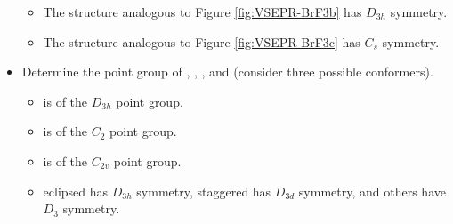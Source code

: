 \documentclass[../notes.tex]{subfiles}
\begin{document}
\begin{itemize}
\begin{itemize}
        \item The structure analogous to Figure \ref{fig:VSEPR-BrF3b} has $D_{3h}$ symmetry.
        \item The structure analogous to Figure \ref{fig:VSEPR-BrF3c} has $C_s$ symmetry.
    \end{itemize}
    \item Determine the point group of , , , and  (consider three possible conformers).
    \begin{itemize}
        \item {} is of the $D_{3h}$ point group.
        \item {} is of the $C_2$ point group.
        \item {} is of the $C_{2v}$ point group.
        \item {} eclipsed has $D_{3h}$ symmetry, staggered has $D_{3d}$ symmetry, and others have $D_3$ symmetry.
    \end{itemize}
\end{itemize}
\end{document}
